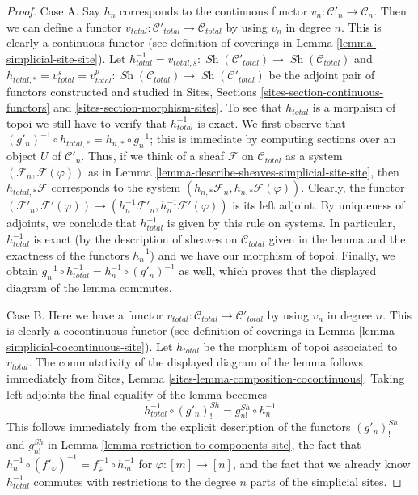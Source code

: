 \documentclass{stacks-project}
\theoremstyle{plain}
\theoremstyle{definition}
\theoremstyle{remark}
\numberwithin{equation}{subsection}
\def\Sh{\mathop{\mathit{Sh}}\nolimits}
\begin{document}
\begin{proof}
Case A. Say $h_n$ corresponds to the continuous functor
$v_n : \mathcal{C}'_n \to \mathcal{C}_n$. Then we can define
a functor $v_{total} : \mathcal{C}'_{total} \to \mathcal{C}_{total}$
by using $v_n$ in degree $n$. This is clearly a continuous functor
(see definition of coverings in Lemma \ref{lemma-simplicial-site-site}).
Let
$h_{total}^{-1} = v_{total, s} :
\Sh(\mathcal{C}'_{total}) \to \Sh(\mathcal{C}_{total})$ and
$h_{total, *} = v_{total}^s = v_{total}^p :
\Sh(\mathcal{C}_{total}) \to \Sh(\mathcal{C}'_{total})$
be the adjoint pair of functors constructed and studied in
Sites, Sections \ref{sites-section-continuous-functors} and
\ref{sites-section-morphism-sites}.
To see that $h_{total}$ is a morphism of topoi
we still have to verify that $h_{total}^{-1}$ is exact.
We first observe that
$(g'_n)^{-1} \circ h_{total, *} = h_{n, *} \circ g_n^{-1}$;
this is immediate by computing sections over an object $U$
of $\mathcal{C}'_n$. Thus, if we think of a sheaf $\mathcal{F}$
on $\mathcal{C}_{total}$ as a system $(\mathcal{F}_n, \mathcal{F}(\varphi))$
as in Lemma \ref{lemma-describe-sheaves-simplicial-site-site}, then
$h_{total, *}\mathcal{F}$ corresponds to
the system $(h_{n, *}\mathcal{F}_n, h_{n, *}\mathcal{F}(\varphi))$.
Clearly, the functor
$(\mathcal{F}'_n, \mathcal{F}'(\varphi)) \to
(h_n^{-1}\mathcal{F}'_n, h_n^{-1}\mathcal{F}'(\varphi))$
is its left adjoint. By uniqueness of adjoints, we conclude that
$h_{total}^{-1}$ is given by this rule on systems. In particular,
$h_{total}^{-1}$ is exact (by the description of sheaves on
$\mathcal{C}_{total}$ given in the lemma and the exactness of
the functors $h_n^{-1}$) and we have our morphism of topoi.
Finally, we obtain $g_n^{-1} \circ h_{total}^{-1} =
h_n^{-1} \circ (g'_n)^{-1}$ as well, which proves that the
displayed diagram of the lemma commutes.

\medskip\noindent
Case B. Here we have a functor
$v_{total} : \mathcal{C}_{total} \to \mathcal{C}'_{total}$
by using $v_n$ in degree $n$. This is clearly a cocontinuous functor
(see definition of coverings in Lemma \ref{lemma-simplicial-cocontinuous-site}).
Let $h_{total}$ be the morphism of topoi associated to $v_{total}$.
The commutativity of the displayed diagram of the lemma follows
immediately from Sites, Lemma \ref{sites-lemma-composition-cocontinuous}.
Taking left adjoints the final equality of the lemma becomes
$$
h_{total}^{-1} \circ (g'_n)^{Sh}_! = g^{Sh}_{n!} \circ h_n^{-1}
$$
This follows immediately from the explicit description of the functors
$(g'_n)^{Sh}_!$ and $g^{Sh}_{n!}$ in
Lemma \ref{lemma-restriction-to-components-site},
the fact that $h_n^{-1} \circ (f'_\varphi)^{-1} =
f_\varphi^{-1} \circ h_m^{-1}$ for $\varphi : [m] \to [n]$, and
the fact that we already know $h_{total}^{-1}$ commutes
with restrictions to the degree $n$ parts of the simplicial sites.
\end{proof}
\end{document}
